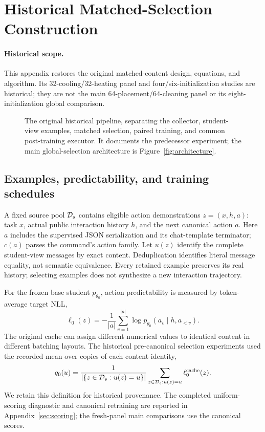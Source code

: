 \section{Historical Matched-Selection Construction}
\label{sec:method}

\paragraph{Historical scope.} This appendix restores the original matched-content design, equations, and algorithm. Its 32-cooling/32-heating panel and four/six-initialization studies are historical; they are not the main 64-placement/64-cleaning panel or its eight-initialization global comparison.
\begin{figure}[htbp]\centering
\resizebox{\linewidth}{!}{}
\caption{The original historical pipeline, separating the collector, student-view examples, matched selection, paired training, and common post-training executor. It documents the predecessor experiment; the main global-selection architecture is Figure~\ref{fig:architecture}.}
\end{figure}

\subsection{Examples, predictability, and training schedules}
A fixed source pool $\mathcal{D}_s$ contains eligible action demonstrations $z=(x,h,a)$: task $x$, actual public interaction history $h$, and the next canonical action $a$. Here $a$ includes the supervised JSON serialization and its chat-template terminator; $c(a)$ parses the command's action family. Let $u(z)$ identify the complete student-view messages by exact content. Deduplication identifies literal message equality, not semantic equivalence. Every retained example preserves its real history; selecting examples does not synthesize a new interaction trajectory.

For the frozen base student $p_{\theta_0}$, action predictability is measured by token-average target NLL,
\begin{equation}
 \ell_0(z)=-\frac{1}{|a|}\sum_{v=1}^{|a|}
 \log p_{\theta_0}(a_v\mid h,a_{<v}).
 \label{eq:nll}
\end{equation}
The original cache can assign different numerical values to identical content in different batching layouts. The historical pre-canonical selection experiments used the recorded mean over copies of each content identity,
\begin{equation}
 q_0(u)=\frac{1}{|\{z\in\mathcal{D}_s:u(z)=u\}|}
 \sum_{z\in\mathcal{D}_s:u(z)=u}\ell_0^{\mathrm{cache}}(z).
 \label{eq:cache}
\end{equation}
We retain this definition for historical provenance. The completed uniform-scoring diagnostic and canonical retraining are reported in Appendix~\ref{sec:scoring}; the fresh-panel main comparisons use the canonical scores.

